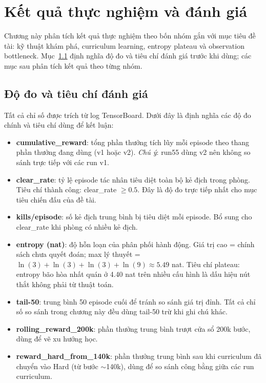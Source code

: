 \clearpage
{}

\setcounter{chapter}{3}
\chapter[{KẾT QUẢ THỰC NGHIỆM VÀ ĐÁNH GIÁ}]{Kết quả thực nghiệm và đánh giá}

Chương này phân tích kết quả thực nghiệm theo bốn nhóm gắn với mục tiêu đề tài: kỹ thuật khám phá, curriculum learning, entropy plateau và observation bottleneck. Mục~\ref{sec:eval_metrics} định nghĩa độ đo và tiêu chí đánh giá trước khi dùng; các mục sau phân tích kết quả theo từng nhóm.

\section{Độ đo và tiêu chí đánh giá}
\label{sec:eval_metrics}

Tất cả chỉ số được trích từ log TensorBoard. Dưới đây là định nghĩa các độ đo chính và tiêu chí dùng để kết luận:

\begin{itemize}
    \item \textbf{cumulative\_reward}: tổng phần thưởng tích lũy mỗi episode theo thang phần thưởng đang dùng (v1 hoặc v2). \textit{Chú ý}: run55 dùng v2 nên không so sánh trực tiếp với các run v1.
    \item \textbf{clear\_rate}: tỷ lệ episode tác nhân tiêu diệt toàn bộ kẻ địch trong phòng. Tiêu chí thành công: clear\_rate $\geq 0.5$. Đây là độ đo trực tiếp nhất cho mục tiêu chiến đấu của đề tài.
    \item \textbf{kills/episode}: số kẻ địch trung bình bị tiêu diệt mỗi episode. Bổ sung cho clear\_rate khi phòng có nhiều kẻ địch.
    \item \textbf{entropy (nat)}: độ hỗn loạn của phân phối hành động. Giá trị cao = chính sách chưa quyết đoán; max lý thuyết = $\ln(3)+\ln(3)+\ln(3)+\ln(9) \approx 5.49$ nat. Tiêu chí plateau: entropy bão hòa nhất quán ở 4.40 nat trên nhiều cấu hình là dấu hiệu nút thắt không phải từ thuật toán.
    \item \textbf{tail-50}: trung bình 50 episode cuối để tránh so sánh giá trị đỉnh. Tất cả chỉ số so sánh trong chương này đều dùng tail-50 trừ khi ghi chú khác.
    \item \textbf{rolling\_reward\_200k}: phần thưởng trung bình trượt cửa sổ 200k bước, dùng để vẽ xu hướng học.
    \item \textbf{reward\_hard\_from\_140k}: phần thưởng trung bình sau khi curriculum đã chuyển vào Hard (từ bước $\sim$140k), dùng để so sánh công bằng giữa các run curriculum.
\end{itemize}

